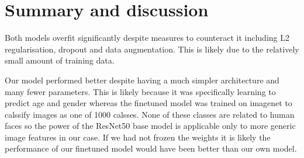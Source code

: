 
\section{Summary and discussion}

Both models overfit significantly despite measures to counteract it including L2 regularisation,
dropout and data augmentation. This is likely due to the relatively small amount of training data.

Our model performed better despite having a much simpler architecture and many fewer parameters.
This is likely because it was specifically learning to predict age and gender whereas the finetuned
model was trained on imagenet to calssify images as one of 1000 calsses. None of these classes
are related to human faces so the power of the ResNet50 base model is applicable only to more
generic image features in our case. If we had not frozen the weights it is likely the performance
of our finetuned model would have been better than our own model.

